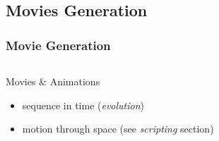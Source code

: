 \subsection{Movies Generation}

\begin{frame}
\frametitle{Movie Generation}

\begin{columns}
\begin{column}{5cm}
	\begin{block}{Movies \& Animations}
	\begin{itemize}
	\item[\ding{224}] sequence in time (\textit{evolution})
	\item[\ding{224}] motion through space (see \textit{scripting} section)
	\end{itemize}
	\end{block}
\end{column}
\begin{column}{5cm}

\end{column}
\end{columns}
\end{frame}

